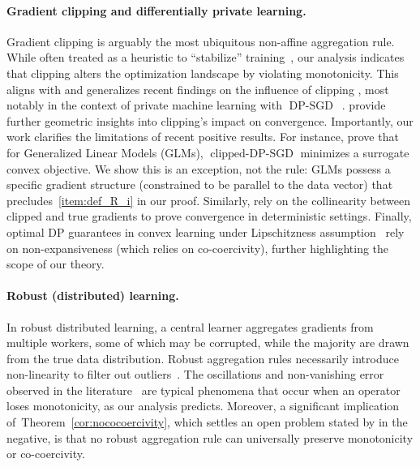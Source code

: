 \documentclass[twoside,11pt]{article}
\let\todo\relax%
\newcommand{\comm}[3][inline]{\todo[#1, size=\tiny]{#2: #3}}
\newcommand{\autodo}[2][inline]{\comm[color=green,#1]{AB}{#2}}
\begin{document}
\paragraph{Gradient clipping and differentially private learning.}
Gradient clipping is arguably the most ubiquitous non-affine aggregation rule.
While often treated as a heuristic to ``stabilize'' training~\citep{zhang2019clippingacceleratestraining}, our analysis indicates that clipping alters the optimization landscape by violating monotonicity.
This aligns with and generalizes recent findings on the influence of clipping \citep[and related work therein]{koloskova2023revisitingclipping,JMLR:v27:24-0637-yunwei-stability-clipping}, most notably in the context of private machine learning with $\operatorname{DP-SGD}$~\citep{Abadi_2016,papernot2021tempered,bagdasaryan2019differentialdisparateimpactonaccuracy}.
\citet{chen2020understandingclipping,pmlr-v130-qian21a} provide further geometric insights into clipping's impact on convergence.
Importantly, our work clarifies the limitations of recent positive results.
For instance, \citet{song2021evading} prove that for Generalized Linear Models (GLMs), $\operatorname{clipped-DP-SGD}$ minimizes a surrogate convex objective. 
We show this is an exception, not the rule: GLMs possess a specific gradient structure (constrained to be parallel to the data vector) that precludes~\ref{item:def_R_i} in our proof.
Similarly, \citet{koloskova2023revisitingclipping} rely on the collinearity between clipped and true gradients to prove convergence in deterministic settings. 
Finally, optimal DP guarantees in convex learning under Lipschitzness assumption~\citep{altschuler-dp} rely on non-expansiveness (which relies on co-coercivity), further highlighting the scope of our theory. 

\paragraph{Robust (distributed) learning.}
In robust distributed learning, a central learner aggregates gradients from multiple workers, some of which may be corrupted, while the majority are drawn from the true data distribution.
Robust aggregation rules necessarily introduce non-linearity to filter out outliers~\citep{blanchard-ml-with-adversaries,Diakonikolas_Kane_2023}. 
The oscillations and non-vanishing error observed in the literature~\citep{karimireddy2021learning,pmlr-v206-allouah23a} are typical phenomena that occur when an operator loses monotonicity, as our analysis predicts.
Moreover, a significant implication of~Theorem~\ref{cor:nococoercivity}, which settles an open problem stated by \citet{boudou2025generalization} in the negative, is that no robust aggregation rule can universally preserve monotonicity or co-coercivity.
\end{document}
